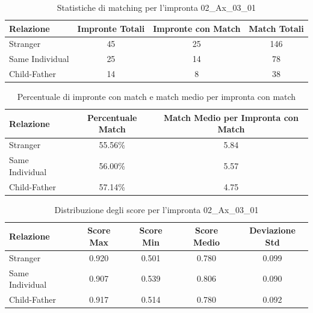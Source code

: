 \begin{table}[htbp]
\centering
\caption{Statistiche di matching per l'impronta 02\_Ax\_03\_01}
\label{tab:results_02_Ax_03_01}
\begin{tabular}{|l|c|c|c|}
\hline
\textbf{Relazione} & \textbf{Impronte Totali} & \textbf{Impronte con Match} & \textbf{Match Totali} \\
\hline
Stranger & 45 & 25 & 146 \\
\hline
Same Individual & 25 & 14 & 78 \\
\hline
Child-Father & 14 & 8 & 38 \\
\hline
\end{tabular}
\end{table}


\begin{table}[htbp]
\centering
\caption{Percentuale di impronte con match e match medio per impronta con match}
\label{tab:match_percentage_02_Ax_03_01}
\begin{tabular}{|l|c|c|}
\hline
\textbf{Relazione} & \textbf{Percentuale Match} & \textbf{Match Medio per Impronta con Match} \\
\hline
Stranger & 55.56\% & 5.84 \\
\hline
Same Individual & 56.00\% & 5.57 \\
\hline
Child-Father & 57.14\% & 4.75 \\
\hline
\end{tabular}
\end{table}


\begin{table}[htbp]
\centering
\caption{Distribuzione degli score per l'impronta 02\_Ax\_03\_01}
\label{tab:scores_02_Ax_03_01}
\begin{tabular}{|l|c|c|c|c|}
\hline
\textbf{Relazione} & \textbf{Score Max} & \textbf{Score Min} & \textbf{Score Medio} & \textbf{Deviazione Std} \\
\hline
Stranger & 0.920 & 0.501 & 0.780 & 0.099 \\
\hline
Same Individual & 0.907 & 0.539 & 0.806 & 0.090 \\
\hline
Child-Father & 0.917 & 0.514 & 0.780 & 0.092 \\
\hline
\end{tabular}
\end{table}

